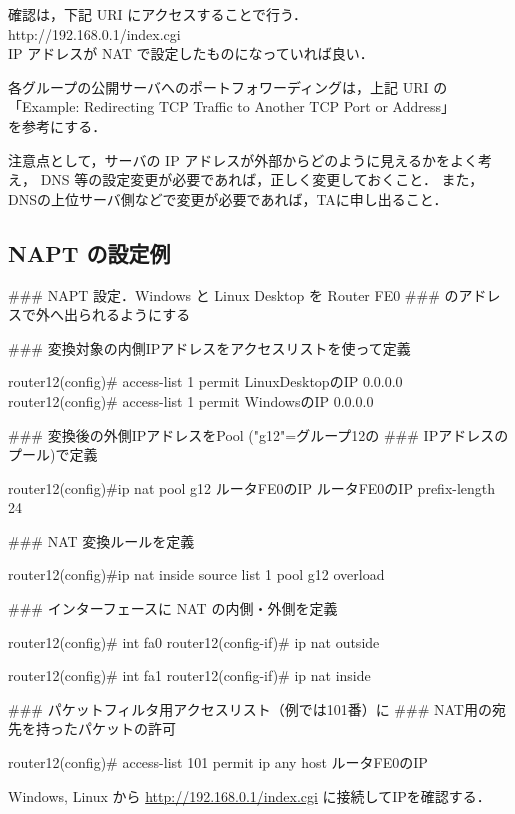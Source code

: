 確認は，下記 URI にアクセスすることで行う．\\
http://192.168.0.1/index.cgi\\
IP アドレスが NAT で設定したものになっていれば良い．

各グループの公開サーバへのポートフォワーディングは，上記 URI の\\
「Example: Redirecting TCP Traffic to Another TCP Port or Address」\\
を参考にする．

注意点として，サーバの IP アドレスが外部からどのように見えるかをよく考え，
DNS 等の設定変更が必要であれば，正しく変更しておくこと．
また，DNSの上位サーバ側などで変更が必要であれば，TAに申し出ること．

\subsection{NAPT の設定例}

\begin{cli}

### NAPT 設定．Windows と Linux Desktop を Router FE0
### のアドレスで外へ出られるようにする

### 変換対象の内側IPアドレスをアクセスリストを使って定義

router12(config)# access-list 1 permit LinuxDesktopのIP  0.0.0.0
router12(config)# access-list 1 permit WindowsのIP  0.0.0.0

### 変換後の外側IPアドレスをPool ("g12"=グループ12の
### IPアドレスのプール)で定義

router12(config)#ip nat pool g12  ルータFE0のIP  ルータFE0のIP  prefix-length 24

### NAT 変換ルールを定義

router12(config)#ip nat inside source list 1 pool g12 overload

### インターフェースに NAT の内側・外側を定義

router12(config)# int fa0
router12(config-if)# ip nat outside

router12(config)# int fa1
router12(config-if)# ip nat inside

### パケットフィルタ用アクセスリスト（例では101番）に
### NAT用の宛先を持ったパケットの許可

router12(config)# access-list 101 permit ip any host ルータFE0のIP

\end{cli}

Windows, Linux から \url{http://192.168.0.1/index.cgi} に接続してIPを確認する．

